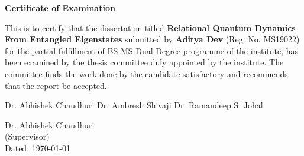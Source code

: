 \begin{center}
    \textbf{\Large Certificate of Examination}
\end{center}

This is to certify that the dissertation titled \textbf{Relational Quantum Dynamics From Entangled Eigenstates} submitted by 
\textbf{Aditya Dev} (Reg. No. MS19022) for the partial fulfillment of BS-MS Dual Degree 
programme of the institute, has been examined by the thesis committee duly appointed by the 
institute. The committee finds the work done by the candidate satisfactory and recommends 
that the report be accepted.

\vspace{4cm}

Dr. Abhishek Chaudhuri \hspace{0.9cm} Dr. Ambresh Shivaji \hspace{0.9cm} Dr. Ramandeep S. Johal

\vspace{4cm}

\begin{flushright}
    Dr. Abhishek Chaudhuri
    \\
    (Supervisor)
    \\
    \vspace{4cm}
    Dated: \today
\end{flushright}